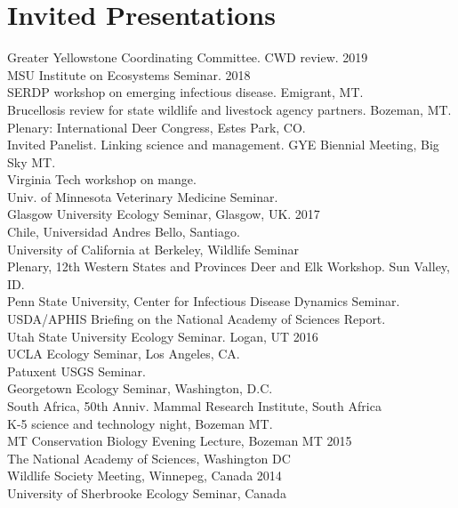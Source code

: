 \documentclass[12pt,]{article}
\begin{document}
\hypertarget{invited-presentations}{%
\section{Invited Presentations}\label{invited-presentations}}

Greater Yellowstone Coordinating Committee. CWD review. \hfill 2019\\
MSU Institute on Ecosystems Seminar. \hfill 2018\\
SERDP workshop on emerging infectious disease. Emigrant, MT.\\
Brucellosis review for state wildlife and livestock agency partners.
Bozeman, MT.\\
Plenary: International Deer Congress, Estes Park, CO.\\
Invited Panelist. Linking science and management. GYE Biennial Meeting,
Big Sky MT.\\
Virginia Tech workshop on mange.\\
Univ. of Minnesota Veterinary Medicine Seminar.\\
Glasgow University Ecology Seminar, Glasgow, UK. \hfill 2017\\
Chile, Universidad Andres Bello, Santiago.\\
University of California at Berkeley, Wildlife Seminar\\
Plenary, 12th Western States and Provinces Deer and Elk Workshop. Sun
Valley, ID.\\
Penn State University, Center for Infectious Disease Dynamics Seminar.\\
USDA/APHIS Briefing on the National Academy of Sciences Report.\\
Utah State University Ecology Seminar. Logan, UT \hfill 2016\\
UCLA Ecology Seminar, Los Angeles, CA.\\
Patuxent USGS Seminar.\\
Georgetown Ecology Seminar, Washington, D.C.\\
South Africa, 50th Anniv. Mammal Research Institute, South Africa\\
K-5 science and technology night, Bozeman MT.\\
MT Conservation Biology Evening Lecture, Bozeman MT \hfill 2015\\
The National Academy of Sciences, Washington DC\\
Wildlife Society Meeting, Winnepeg, Canada \hfill 2014\\
University of Sherbrooke Ecology Seminar, Canada\\
\end{document}

